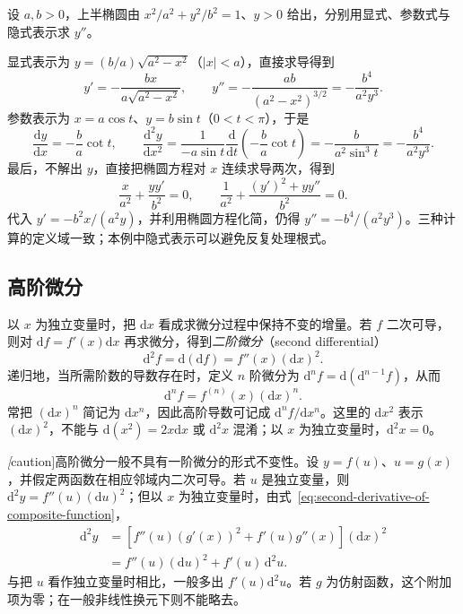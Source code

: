 \begin{example}
\label{ex:ellipse-second-derivative-three-methods}
设 $a,b>0$，上半椭圆由 $x^2/a^2+y^2/b^2=1$、$y>0$ 给出，分别用显式、参数式与隐式表示求 $y''$。
\end{example}
\begin{solve}
显式表示为 $y=(b/a)\sqrt{a^2-x^2}$（$|x|<a$），直接求导得到
\[
    y'=-\frac{bx}{a\sqrt{a^2-x^2}},\qquad
    y''=-\frac{ab}{(a^2-x^2)^{3/2}}
        =-\frac{b^4}{a^2y^3}.
\]
参数表示为 $x=a\cos t$、$y=b\sin t$（$0<t<\pi$），于是
\[
    \frac{\mathrm dy}{\mathrm dx}=-\frac ba\cot t,\qquad
    \frac{\mathrm d^2y}{\mathrm dx^2}
    =\frac1{-a\sin t}\frac{\mathrm d}{\mathrm dt}
      \left(-\frac ba\cot t\right)
    =-\frac b{a^2\sin^3t}
    =-\frac{b^4}{a^2y^3}.
\]
最后，不解出 $y$，直接把椭圆方程对 $x$ 连续求导两次，得到
\[
    \frac x{a^2}+\frac{yy'}{b^2}=0,\qquad
    \frac1{a^2}+\frac{(y')^2+yy''}{b^2}=0.
\]
代入 $y'=-b^2x/(a^2y)$，并利用椭圆方程化简，仍得 $y''=-b^4/(a^2y^3)$。三种计算的定义域一致；本例中隐式表示可以避免反复处理根式。
\end{solve}

\subsection{高阶微分}
\label{subsec:higher-differentials}

以 $x$ 为独立变量时，把 $\mathrm dx$ 看成求微分过程中保持不变的增量。若 $f$ 二次可导，则对 $\mathrm df=f'(x)\mathrm dx$ 再求微分，得到\emph{二阶微分}（second differential）
\[
    \mathrm d^2f=\mathrm d(\mathrm df)=f''(x)(\mathrm dx)^2.
\]
递归地，当所需阶数的导数存在时，定义 $n$ 阶微分为 $\mathrm d^nf=\mathrm d(\mathrm d^{n-1}f)$，从而
\begin{equation}
\label{eq:higher-differentials-independent-variable}
    \mathrm d^nf=f^{(n)}(x)(\mathrm dx)^n.
\end{equation}
常把 $(\mathrm dx)^n$ 简记为 $\mathrm dx^n$，因此高阶导数可记成 $\mathrm d^nf/\mathrm dx^n$。这里的 $\mathrm dx^2$ 表示 $(\mathrm dx)^2$，不能与 $\mathrm d(x^2)=2x\mathrm dx$ 或 $\mathrm d^2x$ 混淆；以 $x$ 为独立变量时，$\mathrm d^2x=0$。

\emph[caution]{高阶微分一般不具有一阶微分的形式不变性。}设 $y=f(u)$、$u=g(x)$，并假定两函数在相应邻域内二次可导。若 $u$ 是独立变量，则 $\mathrm d^2y=f''(u)(\mathrm du)^2$；但以 $x$ 为独立变量时，由式~\eqref{eq:second-derivative-of-composite-function}，
\begin{equation}
\label{eq:second-differential-dependent-inner-variable}
\begin{aligned}
    \mathrm d^2y
    &=\left[f''(u)(g'(x))^2+f'(u)g''(x)\right](\mathrm dx)^2\\
    &=f''(u)(\mathrm du)^2+f'(u)\,\mathrm d^2u.
\end{aligned}
\end{equation}
与把 $u$ 看作独立变量时相比，一般多出 $f'(u)\mathrm d^2u$。若 $g$ 为仿射函数，这个附加项为零；在一般非线性换元下则不能略去。

